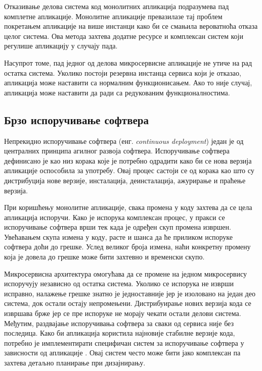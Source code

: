 \documentclass[12pt,oneside]{memoir}
\begin{document}
Отказивање делова система код монолитних апликација подразумева пад комплетне апликације. Монолитне апликације превазилазе тај проблем покретањем апликације на више инстанци како би се смањила вероватноћа отказа целог система. Ова метода захтева додатне ресурсе и комплексан систем који регулише апликацију у случају пада.

Насупрот томе, пад једног од делова микросервисне апликације не утиче на рад остатка система. Уколико постоји резервна инстанца сервиса који је отказао, апликација може наставити са нормалним функционисањем. Ако то није случај, апликација може наставити да ради са редукованим функционалностима.


\subsection{Брзо испоручивање софтвера}

Непрекидно испоручивање софтвера (енг. \textit{continuous deployment}) један је од централних принципа агилног развоја софтвера. Испоручивање софтвера дефинисано је као низ корака које је потребно одрадити како би се нова верзија апликације оспособила за употребу. Овај процес састоји се од корака као што су дистрибуција нове верзије, инсталација, деинсталација, ажурирање и праћење верзија.

При коришћењу монолитне апликације, свака промена у коду захтева да се цела апликација испоручи. Како је испорука комплексан процес, у пракси се испоручивање софтвера врши тек када је одређен скуп промена извршен. Увећавањем скупа измена у коду, расте и шанса да ће приликом испоруке софтвера доћи до грешке. Услед великог броја измена, наћи конкретну промену која је довела до грешке може бити захтевно и временски скупо. 

Микросервисна архитектура омогућава да се промене на једном микросервису испоручују независно од остатка система. Уколико се испорука не изврши исправно, налажење грешке знатно је једноставније јер је изоловано на један део система, док остали остају непромењени. Дистрибуирање нових верзија кода се извршава брже јер се пре испоруке не морају чекати остали делови система. Међутим, раздвајање испоручивања софтвера за сваки од сервиса није без последица. Како би апликација користила најновије стабилне верзије кода, потребно је имплементирати специфичан систем за испоручивање софтвера у зависности од апликације \cite{microservicesBook}. Овај систем често може бити јако комплексан па захтева детаљно планирање при дизајнирању.
\end{document}
